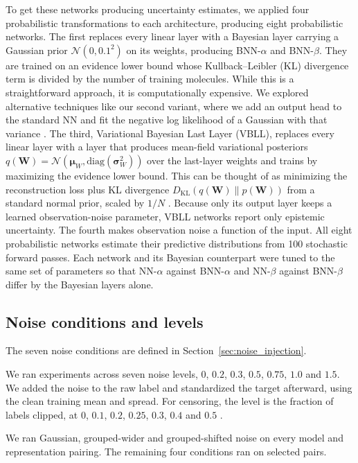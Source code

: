 To get these networks producing uncertainty estimates, we applied four probabilistic transformations to each architecture, producing eight probabilistic networks. The first replaces every linear layer with a Bayesian layer carrying a Gaussian prior $\mathcal{N}(0, 0.1^2)$ on its weights, producing BNN-$\alpha$ and BNN-$\beta$. They are trained on an evidence lower bound whose  Kullback–Leibler (KL) divergence term is divided by the number of training molecules. While this is a straightforward approach, it is computationally expensive. We explored alternative techniques like our second variant, where we add an output head to the standard NN and fit the negative log likelihood of a Gaussian with that variance \citep{kendall2017}. The third, Variational Bayesian Last Layer (VBLL), replaces every linear layer with a layer that produces mean-field variational posteriors $q(\mathbf{W}) = \mathcal{N}(\boldsymbol{\mu}_W, \text{diag}(\boldsymbol{\sigma}_W^2))$ over the last-layer weights and trains by maximizing the evidence lower bound. This can be thought of as minimizing the reconstruction loss plus KL divergence $D_{\text{KL}}(q(\mathbf{W}) \| p(\mathbf{W}))$ from a standard normal prior, scaled by $1/N$ \citep{Harrison2024}. Because only its output layer keeps a learned observation-noise parameter, VBLL networks report only epistemic uncertainty. The fourth makes observation noise a function of the input. All eight probabilistic networks estimate their predictive distributions from 100 stochastic forward passes. Each network and its Bayesian counterpart were tuned to the same set of parameters so that NN-$\alpha$ against BNN-$\alpha$ and NN-$\beta$ against BNN-$\beta$ differ by the Bayesian layers alone.

\subsection{Noise conditions and levels}
The seven noise conditions are defined in Section~\ref{sec:noise_injection}.

We ran experiments across seven noise levels, $0$, $0.2$, $0.3$, $0.5$, $0.75$, $1.0$ and $1.5$. We added the noise to the raw label and standardized the target afterward, using the clean training mean and spread. For censoring, the level is the fraction of labels clipped, at $0$, $0.1$, $0.2$, $0.25$, $0.3$, $0.4$ and $0.5$ \citep{Svensson2025}.

We ran Gaussian, grouped-wider and grouped-shifted noise on every model and representation pairing. The
remaining four conditions ran on selected pairs. 


